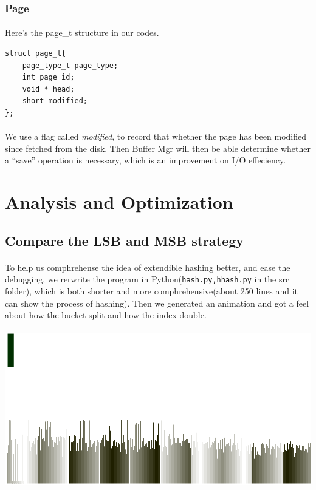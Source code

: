 \documentclass{article}
\begin{document}
        \subsubsection{Page}
            \paragraph{}
                Here's the page\_t structure in our codes.
\begin{verbatim}
struct page_t{
    page_type_t page_type;
    int page_id;
    void * head;
    short modified;
};
\end{verbatim}
            \paragraph{}
                We use a flag called \emph{modified}, to record that whether the page has been modified since fetched from the disk. Then Buffer Mgr will then be able determine whether a ``save'' operation is necessary, which is an improvement on I/O effeciency.
\section{Analysis and Optimization}
    \subsection{Compare the LSB and MSB strategy}
        \paragraph{}
            To help us comphrehense the idea of extendible hashing better, and ease the debugging, we rerwrite the program in Python(\verb|hash.py,hhash.py| in the src folder), which is both shorter and more comphrehensive(about 250 lines and it can show the process of hashing). Then we generated an animation and got a feel about how the bucket split and how the index double.
        \paragraph{} \includegraphics[scale=0.4]{img/pic20000_l.png}
\end{document}
